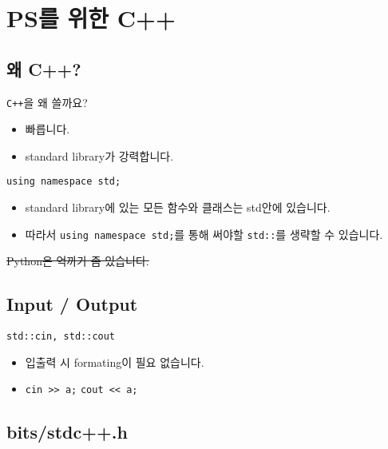 \section{PS를 위한 C++}

\subsection{왜 C++?}

\begin{frame}{\textbf{\currentname}}
    \begin{block}{\texttt{C++}을 왜 쓸까요?}
        \begin{itemize}
            \item 빠릅니다.
            \item standard library가 강력합니다.
        \end{itemize}       
    \end{block}
    
    \begin{block}{\texttt{using namespace std;}}
        \begin{itemize}
            \item standard library에 있는 모든 함수와 클래스는 std안에 있습니다.
            \item 따라서 \texttt{using namespace std;}를 통해 써야할 \texttt{std::}를 생략할 수 있습니다.
        \end{itemize}
    \end{block}

    \sout{\footnotesize Python은 억까가 좀 있습니다.}
\end{frame}

\subsection{Input / Output}
\begin{frame}{\textbf{\currentname}}
    \begin{block}{\texttt{std::cin, std::cout}}
        \begin{itemize}
            \item 입출력 시 formating이 필요 없습니다.
            \item \texttt{cin >> a;} \texttt{cout << a;}
        \end{itemize}
    
    \end{block}
\end{frame}

\subsection{bits/stdc++.h}

